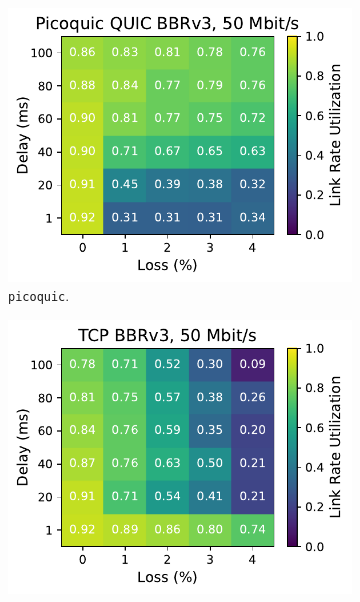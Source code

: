 \begin{figure}[ht]
\begin{subfigure}[b]{0.22\linewidth}
        \includegraphics[width=\linewidth,trim={0 0 2cm 0},clip]{splitting/figures/heatmaps/heatmap_picoquic_bbr3_50mbps.pdf}
        \caption{\texttt{picoquic}.}
    \end{subfigure}
    \begin{subfigure}[b]{0.89cm}
        \includegraphics[width=\linewidth,trim={8cm 0 0 0},clip]{splitting/figures/heatmaps/heatmap_tcp_bbr3_50mbps.pdf}

\end{subfigure}
\end{figure}
